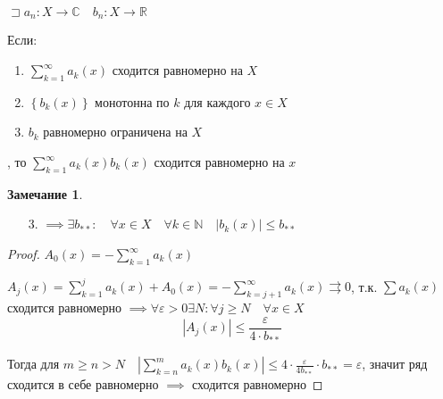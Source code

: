 \documentclass{book}
\newcommand\N{\ensuremath{\mathbb{N}}}
\newcommand\R{\ensuremath{\mathbb{R}}}
\renewcommand\C{\ensuremath{\mathbb{C}}}
\theoremstyle{definition}
\newtheorem*{note}{Замечание}
\begin{document}
    \begin{theorem}

        $\sqsupset a_n: X\to \C\quad b_n: X\to \R$

        Если:
        \begin{enumerate}
            \item $\sum_{k=1}^{\infty } a_k(x)$ сходится равномерно на $X$
            \item  $\left\{ b_k(x) \right\} $ монотонна по $k$ для каждого  $x\in X$
            \item  $b_k$ равномерно ограничена на  $X$
        \end{enumerate}

        , то $\sum_{k=1}^{\infty } a_k(x)b_k(x)$ сходится равномерно на $x$
    \end{theorem}
    \begin{note}
        \begin{enumerate}
            \item [3.] $\implies \exists b_{* *}: \quad \forall x\in X\quad \forall k\in \N \quad |b_k(x)|\leqslant b_{* *}$
        \end{enumerate}
    \end{note}
    \begin{proof}
        $A_0(x) = -\sum_{k=1}^{\infty } a_k(x)$

        $A_j(x) = \sum_{k=1}^{j} a_k\left(x \right)  + A_0(x) = - \sum_{k=j+1}^{\infty } a_k(x) \rightrightarrows 0$, т.к. $\sum a_k(x)$ сходится равномерно  $\implies \forall \varepsilon>0 \exists N: \forall j\geqslant N\quad \forall x\in X $ \[\left| A_j(x) \right| \leqslant \frac{\varepsilon}{4\cdot b_{* * }}\]

        Тогда для $m\geqslant n>N\quad \left| \sum_{k=n}^{m} a_k(x)b_k(x) \right| \leqslant 4 \cdot  \frac{\varepsilon}{4b_{* *}}\cdot b_{* *}  =\varepsilon$, значит ряд сходится в себе равномерно $\implies $ сходится равномерно
    \end{proof}
\end{document}
